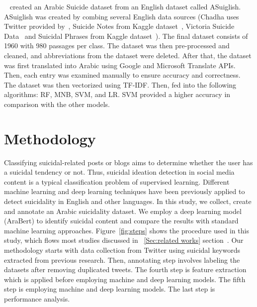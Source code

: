 \documentclass[11pt]{article}
\begin{document}
~\cite{9966481} created an Arabic Suicide dataset from an English dataset called ASuiglish. ASuiglish was created by combing several English data sources (Chadha uses Twitter provided by~\cite{10.1093/comjnl/bxab060}, Suicide Notes from Kaggle dataset~\cite{mashaly_2020}, Victoria Suicide Data~\cite{mashaly_2020} and Suicidal Phrases from Kaggle dataset~\cite{sonu_2020}). The final dataset consists of 1960 with 980 passages per class. The dataset was then pre-processed and cleaned, and abbreviations from the dataset were deleted. After that, the dataset was first translated into Arabic using Google and Microsoft Translate APIs. Then, each entry was examined manually to ensure accuracy and correctness. The dataset was then vectorized using TF-IDF. Then, fed into the following algorithms: RF, MNB, SVM, and LR. SVM provided a higher accuracy in comparison with the other models. %

\section{Methodology}
Classifying suicidal-related posts or blogs aims to determine whether the user has a suicidal tendency or not. Thus, suicidal ideation detection in social media content is a typical classification problem of supervised learning. Different machine learning and deep learning techniques have been previously applied to detect suicidality in English and other languages. In this study, we collect, create and annotate an Arabic suicidality dataset. We employ a deep learning model (AraBert) to identify suicidal content and compare the results with standard machine learning approaches.
Figure~\ref{fig:steps} shows the procedure used in this study, which flows most studies discussed in ~\ref{Sec:related works} section~\cite{9ji2018supervised,1astoveza2018suicidal,11o2015detecting}.
Our methodology starts with data collection from Twitter using suicidal keywords extracted from previous research. Then, annotating step involves labeling the datasets after removing duplicated tweets. The fourth step is feature extraction which is applied before employing machine and deep learning models. The fifth step is employing machine and deep learning models. The last step is performance analysis.

\end{document}

